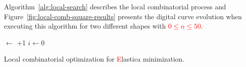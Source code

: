 \documentclass[smallextended]{svjour3}       %
\newcommand{\revision}[1]{\textcolor{red}{#1}}
\begin{document}
Algorithm~\ref{alg:local-search} describes the local combinatorial process and Figure~\ref{fig:local-comb-square-results} presents the digital curve evolution when executing this algorithm for two different shapes with \revision{$0 \leq n \leq 50$}.


\begin{algorithm}
 
 \BlankLine
 \Delta $\longleftarrow$ \Tol+1\;
 $i \longleftarrow 0$\;
 \caption{Local combinatorial optimization for \revision{E}lastica minimization.}
 \label{alg:local-search} 
\end{algorithm}
\end{document}
